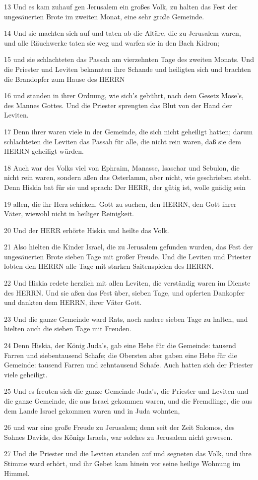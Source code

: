 \par 13 Und es kam zuhauf gen Jerusalem ein großes Volk, zu halten das Fest der ungesäuerten Brote im zweiten Monat, eine sehr große Gemeinde.
\par 14 Und sie machten sich auf und taten ab die Altäre, die zu Jerusalem waren, und alle Räuchwerke taten sie weg und warfen sie in den Bach Kidron;
\par 15 und sie schlachteten das Passah am vierzehnten Tage des zweiten Monats. Und die Priester und Leviten bekannten ihre Schande und heiligten sich und brachten die Brandopfer zum Hause des HERRN
\par 16 und standen in ihrer Ordnung, wie sich's gebührt, nach dem Gesetz Mose's, des Mannes Gottes. Und die Priester sprengten das Blut von der Hand der Leviten.
\par 17 Denn ihrer waren viele in der Gemeinde, die sich nicht geheiligt hatten; darum schlachteten die Leviten das Passah für alle, die nicht rein waren, daß sie dem HERRN geheiligt würden.
\par 18 Auch war des Volks viel von Ephraim, Manasse, Isaschar und Sebulon, die nicht rein waren, sondern aßen das Osterlamm, aber nicht, wie geschrieben steht. Denn Hiskia bat für sie und sprach: Der HERR, der gütig ist, wolle gnädig sein
\par 19 allen, die ihr Herz schicken, Gott zu suchen, den HERRN, den Gott ihrer Väter, wiewohl nicht in heiliger Reinigkeit.
\par 20 Und der HERR erhörte Hiskia und heilte das Volk.
\par 21 Also hielten die Kinder Israel, die zu Jerusalem gefunden wurden, das Fest der ungesäuerten Brote sieben Tage mit großer Freude. Und die Leviten und Priester lobten den HERRN alle Tage mit starken Saitenspielen des HERRN.
\par 22 Und Hiskia redete herzlich mit allen Leviten, die verständig waren im Dienste des HERRN. Und sie aßen das Fest über, sieben Tage, und opferten Dankopfer und dankten dem HERRN, ihrer Väter Gott.
\par 23 Und die ganze Gemeinde ward Rats, noch andere sieben Tage zu halten, und hielten auch die sieben Tage mit Freuden.
\par 24 Denn Hiskia, der König Juda's, gab eine Hebe für die Gemeinde: tausend Farren und siebentausend Schafe; die Obersten aber gaben eine Hebe für die Gemeinde: tausend Farren und zehntausend Schafe. Auch hatten sich der Priester viele geheiligt.
\par 25 Und es freuten sich die ganze Gemeinde Juda's, die Priester und Leviten und die ganze Gemeinde, die aus Israel gekommen waren, und die Fremdlinge, die aus dem Lande Israel gekommen waren und in Juda wohnten,
\par 26 und war eine große Freude zu Jerusalem; denn seit der Zeit Salomos, des Sohnes Davids, des Königs Israels, war solches zu Jerusalem nicht gewesen.
\par 27 Und die Priester und die Leviten standen auf und segneten das Volk, und ihre Stimme ward erhört, und ihr Gebet kam hinein vor seine heilige Wohnung im Himmel.

